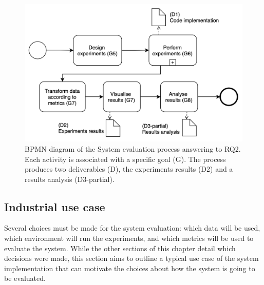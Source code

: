 \begin{figure}[!ht]
    \begin{center}
      \includegraphics[width=\textwidth]{figures/3-method/research_process_rq2.png}
    \caption[System evaluation process]{\gls{BPMN} diagram of the System evaluation process answering to RQ2. Each activity is associated with a specific goal (\gls{G}). The process produces two deliverables (\gls{D}), the experiments results (D2) and a results analysis (D3-partial).}
    \label{fig:DevProcessRQ2}
    \end{center}
\end{figure}

\subsection{Industrial use case}
\label{subsec:use_case}

Several choices must be made for the system evaluation: which data will be used, which environment will run the experiments, and which metrics will be used to evaluate the system. While the other sections of this chapter detail which decisions were made, this section aims to outline a typical use case of the system implementation that can motivate the choices about how the system is going to be evaluated.

